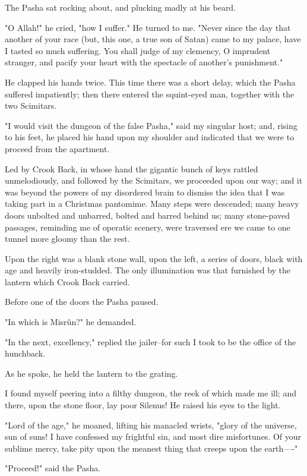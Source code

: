 The Pasha sat rocking about, and plucking madly at his beard.

"O Allah!" he cried, "how I suffer." He turned to me. "Never since the
day that another of your race (but, this one, a true son of Satan)
came to my palace, have I tasted so much suffering. You shall judge
of my clemency, O imprudent stranger, and pacify your heart with the
spectacle of another's punishment."

He clapped his hands twice. This time there was a short delay, which
the Pasha suffered impatiently; then there entered the squint-eyed
man, together with the two Scimitars.

"I would visit the dungeon of the false Pasha," said my singular host;
and, rising to his feet, he placed his hand upon my shoulder and
indicated that we were to proceed from the apartment.

Led by Crook Back, in whose hand the gigantic bunch of keys rattled
unmelodiously, and followed by the Scimitars, we proceeded upon our
way; and it was beyond the powers of my disordered brain to dismiss
the idea that I was taking part in a Christmas pantomime. Many steps
were descended; many heavy doors unbolted and unbarred, bolted and
barred behind us; many stone-paved passages, reminding me of operatic
scenery, were traversed ere we came to one tunnel more gloomy than the
rest.

Upon the right was a blank stone wall, upon the left, a series of
doors, black with age and heavily iron-studded. The only illumination
was that furnished by the lantern which Crook Back carried.

Before one of the doors the Pasha paused.

"In which is Misrûn?" he demanded.

"In the next, excellency," replied the jailer--for such I took to be
the office of the hunchback.

As he spoke, he held the lantern to the grating.

I found myself peering into a filthy dungeon, the reek of which made
me ill; and there, upon the stone floor, lay poor Silenus! He raised
his eyes to the light.

"Lord of the age," he moaned, lifting his manacled wrists, "glory of
the universe, sun of suns! I have confessed my frightful sin, and most
dire misfortunes. Of your sublime mercy, take pity upon the meanest
thing that creeps upon the earth----"

"Proceed!" said the Pasha.

